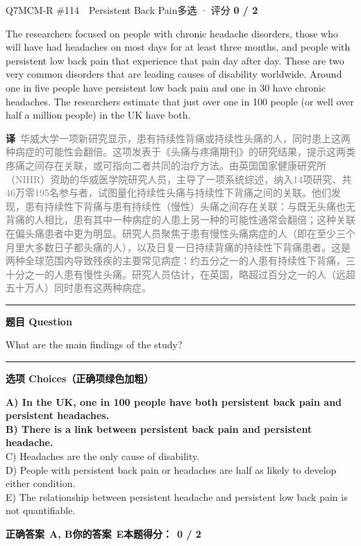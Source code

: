 \documentclass[11pt]{article}
\newcommand{\ptesub}[1]{%
  \par\needspace{2\baselineskip}\smallskip
  {\color{cAccent}\rule[-0.2ex]{3pt}{1.05em}}\hspace{6pt}%
  {\bfseries\color{cHead}#1}\par\nopagebreak\smallskip}
\newcommand{\zh}[1]{{\footnotesize\textcolor{cNote}{\textbf{译}}\ \textcolor{gray}{#1}}}
\begin{document}
\begin{qblock}{Q7\quad MCM-R \#114\ \ Persistent Back Pain}{多选 · 评分 \textcolor{cAccent}{\bfseries 0 / 2}}
\begin{promptbox}
The researchers focused on people with chronic headache disorders, those who will have had headaches on most days for at least three months, and people with persistent low back pain that experience that pain day after day. These are two very common disorders that are leading causes of disability worldwide. Around one in five people have persistent low back pain and one in 30 have chronic headaches. The researchers estimate that just over one in 100 people (or well over half a million people) in the UK have both.
\end{promptbox}
\zh{华威大学一项新研究显示，患有持续性背痛或持续性头痛的人，同时患上这两种病症的可能性会翻倍。这项发表于《头痛与疼痛期刊》的研究结果，提示这两类疼痛之间存在关联，或可指向二者共同的治疗方法。由英国国家健康研究所（NIHR）资助的华威医学院研究人员，主导了一项系统综述，纳入14项研究、共46万零195名参与者，试图量化持续性头痛与持续性下背痛之间的关联。他们发现，患有持续性下背痛与患有持续性（慢性）头痛之间存在关联：与既无头痛也无背痛的人相比，患有其中一种病症的人患上另一种的可能性通常会翻倍；这种关联在偏头痛患者中更为明显。研究人员聚焦于患有慢性头痛病症的人（即在至少三个月里大多数日子都头痛的人），以及日复一日持续背痛的持续性下背痛患者。这是两种全球范围内导致残疾的主要常见病症：约五分之一的人患有持续性下背痛，三十分之一的人患有慢性头痛。研究人员估计，在英国，略超过百分之一的人（远超五十万人）同时患有这两种病症。}
\ptesub{题目 Question}
\begin{notebox}What are the main findings of the study?\end{notebox}
\ptesub{选项 Choices（正确项绿色加粗）}
{\small
{\color{cFix}\textbf{A) In the UK, one in 100 people have both persistent back pain and persistent headaches.}}\\
{\color{cFix}\textbf{B) There is a link between persistent back pain and persistent headache.}}\\
C) Headaches are the only cause of disability.\\
D) People with persistent back pain or headaches are half as likely to develop either condition.\\
E) The relationship between persistent headache and persistent low back pain is not quantifiable.}
\par\smallskip
\textbf{正确答案}\ \textcolor{cFix}{\bfseries A, B}\qquad\textbf{你的答案}\ {\color{cWrong}\bfseries E}\qquad\textbf{本题得分：}\ {\color{cAccent}\bfseries 0 / 2}
\end{qblock}
\end{document}
